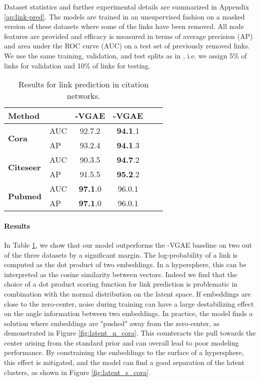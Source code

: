 \documentclass[letterpaper]{article}
\newcommand{\Sv}{}
\newcommand{\Nv}{}
\begin{document}
Dataset statistics and further experimental details are summarized in Appendix \ref{ap:link-pred}. The models are trained in an unsupervised fashion on a masked version of these datasets where some of the links have been removed. All node features are provided and efficacy is measured in terms of average precision (AP) and area under the ROC curve (AUC) on a test set of previously removed links. We use the same training, validation, and test splits as in \cite{kipf2016VGAE}, i.e. we assign 5\% of links for validation and 10\% of links for testing.


\begin{table}[H]
  \centering
    \caption{Results for link prediction in citation networks.}
    \bigskip
    \begin{tabular}{ll|cccc}
    \toprule
      \textbf{Method}  &  & \textbf{\Nv-VGAE} & \textbf{\Sv-VGAE} \\
    \midrule
        \multirow{2}{*}{\textbf{Cora}} & AUC & 92.7{\tiny.2} & \textbf{94.1}{\tiny.1} \\
        & AP &  93.2{\tiny.4} & \textbf{94.1}{\tiny.3} \\
    \midrule
        \multirow{2}{*}{\textbf{Citeseer}}& AUC & 90.3{\tiny.5} & \textbf{94.7}{\tiny.2} \\
        & AP & 91.5{\tiny.5} & \textbf{95.2}{\tiny.2} \\
    \midrule
    \multirow{2}{*}{\textbf{Pubmed}}& AUC & \textbf{97.1}{\tiny.0} & 96.0{\tiny.1} \\
    & AP & \textbf{97.1}{\tiny.0} & 96.0{\tiny.1} \\
    \bottomrule
    \end{tabular}
  \label{tab:graph}
\end{table}

\paragraph{Results} In Table \ref{tab:graph}, we show that our model outperforms the \Nv-VGAE baseline on two out of the three datasets by a significant margin. The log-probability of a link is computed as the dot product of two embeddings. In a hypersphere, this can be interpreted as the cosine similarity between vectors. Indeed we find that the choice of a dot product scoring function for link prediction is problematic in combination with the normal distribution on the latent space. If embeddings are close to the zero-center, noise during training can have a large destabilizing effect on the angle information between two embeddings. In practice, the model finds a solution where embeddings are "pushed" away from the zero-center, as demonstrated in Figure \ref{fig:latent_n_cora}. This counteracts the pull towards the center arising from the standard prior and can overall lead to poor modeling performance. By constraining the embeddings to the surface of a hypersphere, this effect is mitigated, and the model can find a good separation of the latent clusters, as shown in Figure \ref{fig:latent_s_cora}. 
\end{document}
